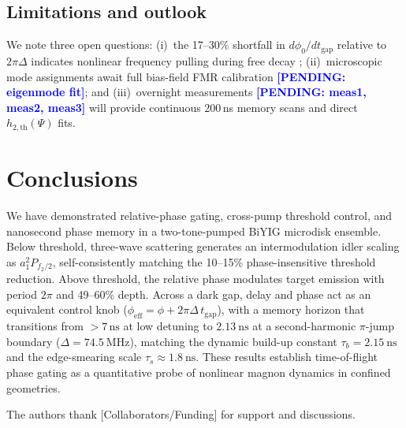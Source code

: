 \documentclass[aps,prb,reprint,superscriptaddress,floatfix]{revtex4-2}
\newcommand{\pend}[1]{\textcolor{blue}{\textbf{[PENDING: #1]}}}
\newcommand{\pend}[1]{}
\newcommand{\tgap}{t_{\mathrm{gap}}}
\begin{document}
\subsection{Limitations and outlook}\label{sec:disc_limits}

We note three open questions: (i)~the 17--30\% shortfall in $d\phi_0/d\tgap$ relative to $2\pi\Delta$ indicates nonlinear frequency pulling during free decay \cite{massouras24}; (ii)~microscopic mode assignments await full bias-field FMR calibration \pend{eigenmode fit}; and (iii)~overnight measurements \pend{meas1, meas2, meas3} will provide continuous 200\,ns memory scans and direct $h_{2,\mathrm{th}}(\Psi)$ fits.

\section{Conclusions}\label{sec:concl}

We have demonstrated relative-phase gating, cross-pump threshold control, and nanosecond phase memory in a two-tone-pumped BiYIG microdisk ensemble. Below threshold, three-wave scattering generates an intermodulation idler scaling as $a_1^2 P_{f_2/2}$, self-consistently matching the 10--15\% phase-insensitive threshold reduction. Above threshold, the relative phase modulates target emission with period $2\pi$ and 49--60\% depth. Across a dark gap, delay and phase act as an equivalent control knob ($\phi_{\mathrm{eff}}=\phi+2\pi\Delta\,\tgap$), with a memory horizon that transitions from $>7\,\text{ns}$ at low detuning to $\SI{2.13}{\nano\second}$ at a second-harmonic $\pi$-jump boundary ($\Delta=\SI{74.5}{\mega\hertz}$), matching the dynamic build-up constant $\tau_b=\SI{2.15}{\nano\second}$ and the edge-smearing scale $\tau_s\approx\SI{1.8}{\nano\second}$. These results establish time-of-flight phase gating as a quantitative probe of nonlinear magnon dynamics in confined geometries.

\begin{acknowledgments}
The authors thank [Collaborators/Funding] for support and discussions.
\end{acknowledgments}

\appendix
\end{document}
